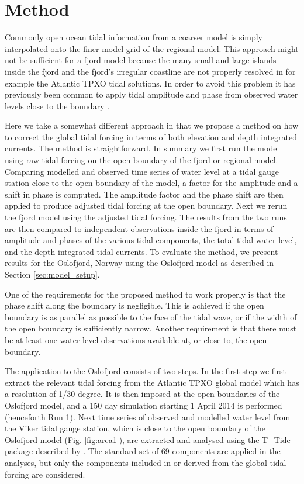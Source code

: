 \section{Method}

Commonly open ocean tidal information from a coarser model is simply interpolated onto the finer model grid of the regional model. This approach might not be sufficient for a fjord model because the many small and large islands inside the fjord and the fjord's irregular coastline are not properly resolved in for example the Atlantic TPXO tidal solutions. In order to avoid this problem it has previously been common to apply tidal amplitude and phase from observed water levels close to the boundary \cite[i.e.]{foreman90,svendsen96,lynge13}. 

Here we take a somewhat different approach in that we propose a method on how to correct the global tidal forcing in terms of both elevation and depth integrated currents. The method is straightforward. In summary we first run the model using raw tidal forcing on the open boundary of the fjord or regional model. Comparing modelled and observed time series of water level at a tidal gauge station close to the open boundary of the model, a factor for the amplitude and a shift in phase is computed. The amplitude factor and the phase shift are then applied to produce adjusted tidal forcing at the open boundary. Next we rerun the fjord model using the adjusted tidal forcing. The results from the two runs are then compared to independent observations inside the fjord in terms of amplitude and phases of the various tidal components, the total tidal water level, and the depth integrated tidal currents. To evaluate the method, we present results for the Oslofjord, Norway using the Oslofjord model as described in Section \ref{sec:model_setup}. 

One of the requirements for the proposed method to work properly is that the phase shift along the boundary is negligible. This is achieved if the open boundary is as parallel as possible to the face of the tidal wave, or if the width of the open boundary is sufficiently narrow. Another requirement is that there must be at least one water level observations available at, or close to, the open boundary.

The application to the Oslofjord consists of two steps. In the first step we first extract the relevant tidal forcing from the Atlantic TPXO global model which has a resolution of 1/30 degree. It is then imposed at the open boundaries of the Oslofjord model, and a 150 day simulation starting 1 April 2014 is performed (henceforth Run 1). Next time series of observed and modelled water level from the Viker tidal gauge station, which is close to the open boundary of the Oslofjord model (Fig. \ref{fig:area1}), are extracted and analysed using the T\_Tide package described by \cite{pawlowicz02}. The standard set of 69 components are applied in the analyses, but only the components included in or derived from the global tidal forcing are considered.
 
